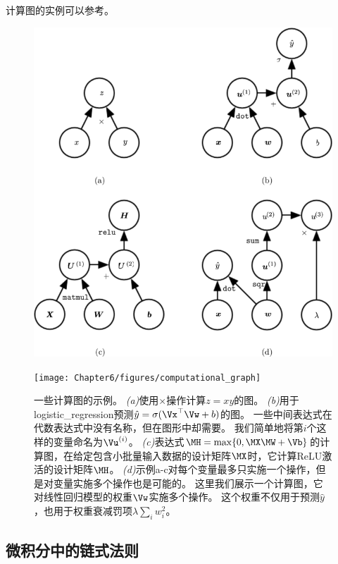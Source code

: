 计算图的实例可以参考。
\begin{figure}[!htb]
\ifOpenSource
\centerline{\includegraphics[scale=0.5]{images/50.png}}
\else
\centerline{\texttt{[image: Chapter6/figures/computational\_graph]}}
\fi
\captionsetup{singlelinecheck=off}
\caption{一些计算图的示例。
\emph{(a)}使用$\times$操作计算$z = xy$的图。 
\emph{(b)}用于\gls{logistic_regression}预测$\hat{y} = \sigma(\Vx^\top \Vw + b)$的图。 一些中间表达式在代数表达式中没有名称，但在图形中却需要。
我们简单地将第$i$个这样的变量命名为$\Vu^{(i)}$。
\emph{(c)}表达式$\MH = \max \{ 0, \MX\MW+ \Vb \}$的计算图，在给定包含小批量输入数据的设计矩阵$\MX$时，它计算\gls{ReLU}激活的设计矩阵$\MH$。
\emph{(d)}示例a-c对每个变量最多只实施一个操作，但是对变量实施多个操作也是可能的。 这里我们展示一个计算图，它对线性回归模型的权重$\Vw$实施多个操作。
这个权重不仅用于预测$\hat{y}$，也用于权重衰减罚项$\lambda \sum_i w_i^2$。}
\label{fig:chap6_computational_graph}
\end{figure}

\subsection{微积分中的链式法则}
\label{sec:chain_rule_of_calculus}

